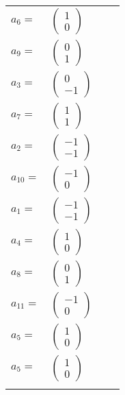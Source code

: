 \documentclass[1p]{elsarticle_modified}
\theoremstyle{definition}
\begin{document}
\begin{tabular}{m{7pt} m{180pt} m{7pt} m{180pt} }
\flushright $a_{6}=$&$\begin{pmatrix}1\\0\end{pmatrix}$ \\
\flushright $a_{9}=$&$\begin{pmatrix}0\\1\end{pmatrix}$ \\
\flushright $a_{3}=$&$\begin{pmatrix}0\\-1\end{pmatrix}$ \\
\flushright $a_{7}=$&$\begin{pmatrix}1\\1\end{pmatrix}$ \\
\flushright $a_{2}=$&$\begin{pmatrix}-1\\-1\end{pmatrix}$ \\
\flushright $a_{10}=$&$\begin{pmatrix}-1\\0\end{pmatrix}$ \\
\flushright $a_{1}=$&$\begin{pmatrix}-1\\-1\end{pmatrix}$ \\
\flushright $a_{4}=$&$\begin{pmatrix}1\\0\end{pmatrix}$ \\
\flushright $a_{8}=$&$\begin{pmatrix}0\\1\end{pmatrix}$ \\
\flushright $a_{11}=$&$\begin{pmatrix}-1\\0\end{pmatrix}$ \\
\flushright $a_{5}=$&$\begin{pmatrix}1\\0\end{pmatrix}$\\ \flushright $a_{5}=$&$\begin{pmatrix}1\\0\end{pmatrix}$\\&\end{tabular}
\end{document}
